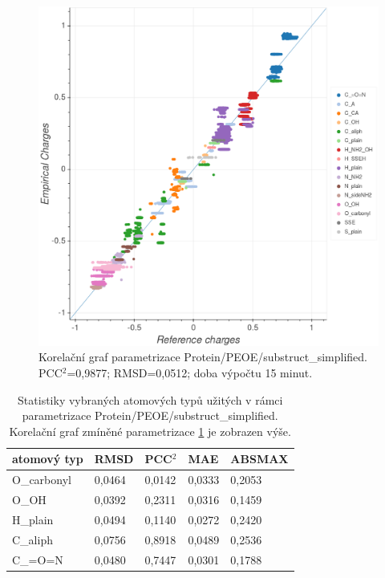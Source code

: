 \vspace*{0cm}
\begin{figure}[h]
\begin{center}
\includegraphics[width=13cm]{pictures/graph_peptidesimpl_PEOE.png}
\caption{Korelační graf parametrizace Protein/PEOE/substruct\_simplified. PCC$^2$=0,9877; RMSD=0,0512; doba výpočtu 15 minut.}
\label{graph_peptidesimpl_PEOE}
\end{center}
\end{figure}

\begin{table}[H]
    \renewcommand{\arraystretch}{1.35}
    \centering
    \begin{tabular}{l|l|l|l|l}
         \textbf{atomový typ} &  \textbf{RMSD} & \textbf{PCC$^2$} & \textbf{MAE} & \textbf{ABSMAX} \\
         \hline
         O\_carbonyl & 0,0464 & 0,0142 & 0,0333 & 0,2053 \\
         O\_OH & 0,0392 & 0,2311 & 0,0316 & 0,1459 \\
         H\_plain & 0,0494 & 0,1140 & 0,0272 & 0,2420\\
         C\_aliph & 0,0756 & 0,8918 & 0,0489 & 0,2536\\
         C\_=O=N & 0,0480 & 0,7447 & 0,0301 & 	0,1788
    \end{tabular}
    \caption{Statistiky vybraných atomových typů užitých v rámci parametrizace Protein/PEOE/substruct\_simplified. Korelační graf zmíněné parametrizace \ref{graph_peptidesimpl_PEOE} je zobrazen výše.}
    \label{priloha_atom_types_statistics}
\end{table}